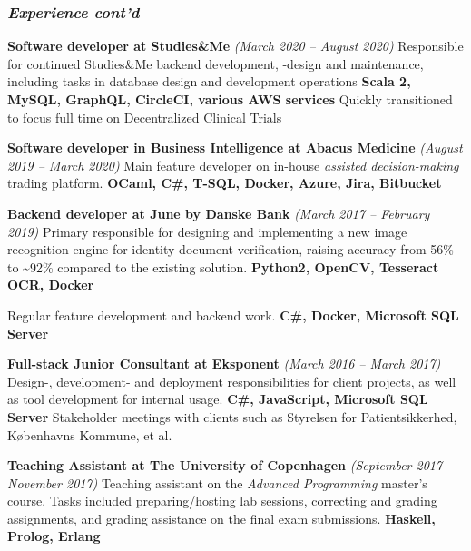 \documentclass[10pt, a4paper]{article}
\begin{document}
\subsubsection*{\textit{Experience cont'd}}
\begin{outline}

\1 \textbf{Software developer at Studies\&Me} \textit{(March 2020 -- August 2020)}
\2 Responsible for continued Studies\&Me backend development, -design and maintenance, including tasks in database design and development operations\newline
    {\footnotesize \textbf{Scala 2, MySQL, GraphQL, CircleCI, various AWS services}}
\2 Quickly transitioned to focus full time on Decentralized Clinical Trials 

\1 \textbf{Software developer in Business Intelligence at Abacus Medicine} \textit{(August 2019 -- March 2020)}
  \2 Main feature developer on in-house \textit{assisted decision-making} trading platform.\newline
  {\footnotesize \textbf{OCaml, C\#, T-SQL, Docker, Azure, Jira, Bitbucket}}

\1 \textbf{Backend developer at June by Danske Bank} \textit{(March 2017 -- February 2019)}
  \2 Primary responsible for designing and implementing a new image recognition engine for identity document verification, raising accuracy from 56\% to \textasciitilde 92\% compared to the existing solution.\newline
    {\footnotesize \textbf{Python2, OpenCV, Tesseract OCR, Docker}}

  \2 Regular feature development and backend work.\newline
    {\footnotesize \textbf{C\#, Docker, Microsoft SQL Server}}

\1 \textbf{Full-stack Junior Consultant at Eksponent} \textit{(March 2016 -- March 2017)}
\2 Design-, development- and deployment responsibilities for client projects, as well as tool development for internal usage.\newline
  {\footnotesize \textbf{C\#, JavaScript, Microsoft SQL Server}}
\2 Stakeholder meetings with clients such as Styrelsen for Patientsikkerhed, Københavns Kommune, et al.

\1 \textbf{Teaching Assistant at The University of Copenhagen} \textit{(September 2017 -- November 2017)}
\2 Teaching assistant on the \textit{Advanced Programming} master's course. Tasks included preparing/hosting lab sessions, correcting and grading assignments, and grading assistance on the final exam submissions.\newline
  {\footnotesize\textbf{Haskell, Prolog, Erlang}}
\end{outline}
\end{document}
